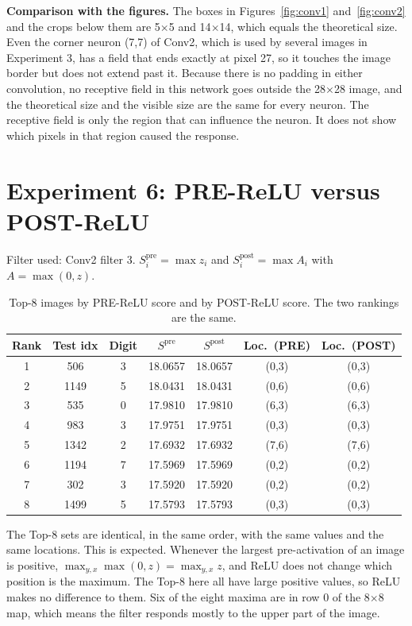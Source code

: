 \documentclass[12pt]{article}
\begin{document}
\textbf{Comparison with the figures.} The boxes in Figures~\ref{fig:conv1} and~\ref{fig:conv2} and the crops below them are 5$\times$5 and 14$\times$14, which equals the theoretical size. Even the corner neuron (7,7) of Conv2, which is used by several images in Experiment 3, has a field that ends exactly at pixel 27, so it touches the image border but does not extend past it. Because there is no padding in either convolution, no receptive field in this network goes outside the 28$\times$28 image, and the theoretical size and the visible size are the same for every neuron. The receptive field is only the region that can influence the neuron. It does not show which pixels in that region caused the response.


\section{Experiment 6: PRE-ReLU versus POST-ReLU}

Filter used: Conv2 filter 3. $S^{\mathrm{pre}}_i=\max z_i$ and $S^{\mathrm{post}}_i=\max A_i$ with $A=\max(0,z)$.

\begin{table}[H]
\centering
\small
\begin{tabular}{ccccccc}
\toprule
Rank & Test idx & Digit & $S^{\mathrm{pre}}$ & $S^{\mathrm{post}}$ & Loc.\ (PRE) & Loc.\ (POST) \\
\midrule
1 & 506  & 3 & 18.0657 & 18.0657 & (0,3) & (0,3) \\
2 & 1149 & 5 & 18.0431 & 18.0431 & (0,6) & (0,6) \\
3 & 535  & 0 & 17.9810 & 17.9810 & (6,3) & (6,3) \\
4 & 983  & 3 & 17.9751 & 17.9751 & (0,3) & (0,3) \\
5 & 1342 & 2 & 17.6932 & 17.6932 & (7,6) & (7,6) \\
6 & 1194 & 7 & 17.5969 & 17.5969 & (0,2) & (0,2) \\
7 & 302  & 3 & 17.5920 & 17.5920 & (0,2) & (0,2) \\
8 & 1499 & 5 & 17.5793 & 17.5793 & (0,3) & (0,3) \\
\bottomrule
\end{tabular}
\caption{Top-8 images by PRE-ReLU score and by POST-ReLU score. The two rankings are the same.}
\end{table}

The Top-8 sets are identical, in the same order, with the same values and the same locations. This is expected. Whenever the largest pre-activation of an image is positive, $\max_{y,x}\max(0,z)=\max_{y,x}z$, and ReLU does not change which position is the maximum. The Top-8 here all have large positive values, so ReLU makes no difference to them. Six of the eight maxima are in row 0 of the 8$\times$8 map, which means the filter responds mostly to the upper part of the image.
\end{document}
